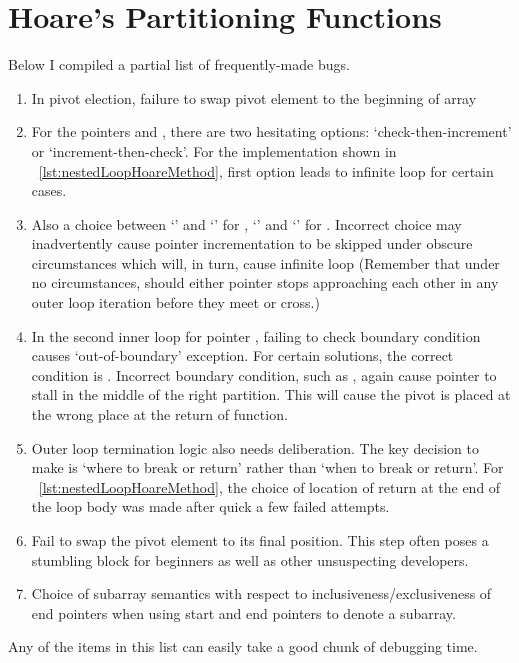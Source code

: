 \section{Hoare's Partitioning Functions}\label{sec:impl-varieties}

Below I compiled a partial list of frequently-made bugs.

\begin{enumerate}
    \item In pivot election, failure to swap pivot element to the beginning of array
    \item For the pointers  and , there are two hesitating options:
    `check-then-increment' or `increment-then-check'.
    For the implementation shown in ~\autoref{lst:nestedLoopHoareMethod},
    first option leads to infinite loop for certain cases.
    \item Also a choice between `' and `' for ,
    `' and `' for .
    Incorrect choice may inadvertently cause pointer incrementation to be skipped under
    obscure circumstances which will, in turn, cause infinite loop
    (Remember that under no circumstances, should either pointer stops approaching each other in
    any outer loop iteration before they meet or cross.)
    \item\label{itm:quicksort-boundary-condition} In the second inner loop for pointer ,
    failing to check boundary condition causes `out-of-boundary' exception.
    For certain solutions, the correct condition is .
    Incorrect boundary condition, such as , again cause pointer  to stall
    in the middle of the right partition.
    This will cause the pivot is placed at the wrong place at the return of function.
    \item Outer loop termination logic also needs deliberation.
    The key decision to make is `where to break or return' rather than `when to break or return'.
    For ~\autoref{lst:nestedLoopHoareMethod}, the choice of location of return
    at the end of the loop body was made after quick a few failed attempts.
    \item Fail to swap the pivot element to its final position.
    This step often poses a stumbling block for beginners as well as other unsuspecting
    developers.
    \item Choice of subarray semantics with respect to inclusiveness/exclusiveness of end pointers
    when using start and end pointers to denote a subarray.
\end{enumerate}
Any of the items in this list can easily take a good chunk of debugging time.

